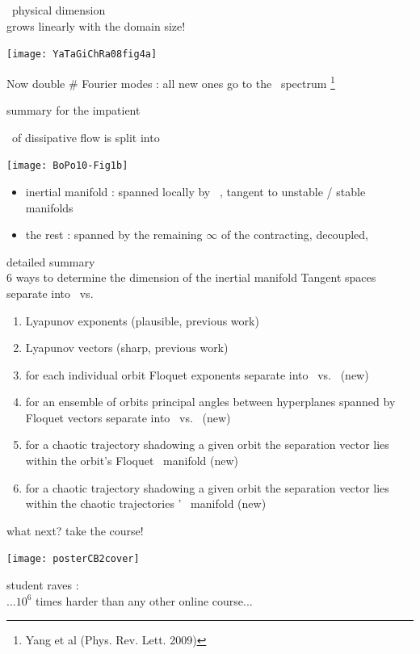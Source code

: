 \begin{frame}{\KS\ physical dimension \\
grows linearly with the domain size!}
\begin{center}
\texttt{[image: YaTaGiChRa08fig4a]}
\end{center}

Now double \# Fourier modes : all new ones go to the \transient\ spectrum
\footnote{\footnotesize
Yang et al (Phys. Rev. Lett. 2009)}
\end{frame}


\begin{frame}{summary for the impatient}
\begin{block}{\statesp\ of dissipative flow is split into}
\begin{center}
\texttt{[image: BoPo10-Fig1b]}
\end{center}
\end{block}
\begin{itemize}
  \item inertial manifold :
spanned locally by
\textcolor{red}{\entangled\ \cLvs}, tangent to unstable / stable manifolds
  \item the rest : spanned by the remaining
$\infty$ of the contracting, decoupled,
\textcolor{blue}{\transient\ \cLvs}
\end{itemize}
\end{frame}

\begin{frame}{detailed summary \\
 6 ways to determine the dimension of the inertial manifold}
Tangent spaces separate into \entangled\ vs. \transient

\begin{enumerate}
  \item Lyapunov exponents (plausible, previous work)
  \item Lyapunov vectors (sharp, previous work)
  \item
for each individual orbit Floquet exponents separate into \entangled\ vs.
\transient\ (new)
  \item
for an ensemble of orbits principal angles between hyperplanes spanned by
Floquet vectors separate into \entangled\ vs. \transient\   (new)
  \item
for a chaotic trajectory shadowing a given orbit the separation
vector lies within the orbit's Floquet \entangled\ manifold (new)
  \item
for a chaotic trajectory shadowing a given orbit the separation
vector lies within the chaotic trajectories \cLvs' \entangled\ manifold
(new)
\end{enumerate}
\end{frame}


\begin{frame}{what next? take the course!}
\begin{center}
\texttt{[image: posterCB2cover]}
\end{center}
\vfill
student raves : \\
...$10^6$ times harder than any other online course...
\end{frame}




